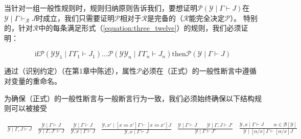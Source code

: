 当针对一组一般性规则时，规则归纳原则告诉我们，要想证明$\mathcal{P}(\mathcal{Y} \mid \Gamma \vdash J)$在$\mathcal{Y} \mid \Gamma \vdash_{\mathcal{R}} J$时成立，我们只需要证明$\mathcal{P}$相对于$\mathcal{R}$是完备的（$\mathcal{R}$能完全决定$\mathcal{P}$）。
特别的，针对$\mathcal{R}$中的每条满足形式（\ref{equation:three_twelve}）的规则，我们必须证明：

$$\text{if} \mathcal{P} (\mathcal{Y}\mathcal{Y}_1 \mid \Gamma \Gamma_1 \vdash J_1) \dots \mathcal{P} (\mathcal{Y} \mathcal{Y}_n \mid \Gamma \Gamma_n \vdash J_n) \text{then} \mathcal{P} (\mathcal{\mathcal{Y}} \mid \Gamma \vdash J)$$

通过（识别约定）（在第1章中陈述），属性$ \mathcal{P} $必须在（正式）的一般性断言中遵循对变量的重命名。

为确保（正式）的一般性断言与一般断言行为一致，我们必须始终确保以下结构规则可以被接受

\begin{subequations}
    \begin{align}
        \frac{}{\mathcal{Y} \mid \Gamma,J \vdash J} \label{equation:three_fourteen_a}
    \end{align}
    \begin{align}
        \frac{\mathcal{Y} \mid \Gamma \vdash J}{\mathcal{Y} \mid \Gamma,J' \vdash J} \label{equation:three_fourteen_b}
    \end{align}
    \begin{align}
        \frac{\mathcal{Y} \mid \Gamma \vdash J}{\mathcal{Y},x \mid \Gamma \vdash J} \label{equation:three_fourteen_c}
    \end{align}
    \begin{align}
        \frac{\mathcal{Y},x' \mid [x \Leftrightarrow x'] \Gamma \vdash [x \Leftrightarrow x'] J}{\mathcal{Y},x \mid  \Gamma \vdash J} \label{equation:three_fourteen_d}
    \end{align}
    \begin{align}
        \frac{\mathcal{Y} \mid \Gamma \vdash J \qquad \mathcal{Y} \mid \Gamma,J \vdash J'}{\mathcal{Y} \mid \Gamma \vdash J'} \label{equation:three_fourteen_e}
    \end{align}
    \begin{align}
        \frac{\mathcal{Y},x \mid \Gamma \vdash J \qquad \alpha \in \mathcal{B}[\mathcal{Y}]}{\mathcal{Y} \mid [\alpha / x] \Gamma \vdash [\alpha / x] J} \label{equation:three_fourteen_f}
    \end{align}
\end{subequations}

